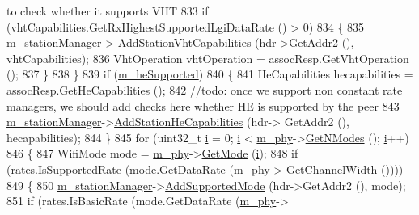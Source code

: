 \begin{DoxyCode}
{       to check whether it supports VHT}
833                   \textcolor{keywordflow}{if} (vhtCapabilities.GetRxHighestSupportedLgiDataRate () > 0)
834                     \{
835                       \hyperlink{classns3_1_1RegularWifiMac_a76d1a5e27b64bfe36f24a55d1eea2775}{m\_stationManager}->
      \hyperlink{classns3_1_1WifiRemoteStationManager_a52b9e283f99e113cba95afbc2acea72b}{AddStationVhtCapabilities} (hdr->GetAddr2 (), vhtCapabilities);
836                       VhtOperation vhtOperation = assocResp.GetVhtOperation ();
837                     \}
838                 \}
839               \textcolor{keywordflow}{if} (\hyperlink{classns3_1_1RegularWifiMac_a9458143c722fa0b6e5d223d41585842a}{m\_heSupported})
840                 \{
841                   HeCapabilities hecapabilities = assocResp.GetHeCapabilities ();
842                   \textcolor{comment}{//todo: once we support non constant rate managers, we should add checks here whether HE
       is supported by the peer}
843                   \hyperlink{classns3_1_1RegularWifiMac_a76d1a5e27b64bfe36f24a55d1eea2775}{m\_stationManager}->\hyperlink{classns3_1_1WifiRemoteStationManager_a948fccf8ed2cb0dcfaa73784ec35db8e}{AddStationHeCapabilities} (hdr->
      GetAddr2 (), hecapabilities);
844                 \}
845               \textcolor{keywordflow}{for} (uint32\_t \hyperlink{bernuolliDistribution_8m_a6f6ccfcf58b31cb6412107d9d5281426}{i} = 0; \hyperlink{bernuolliDistribution_8m_a6f6ccfcf58b31cb6412107d9d5281426}{i} < \hyperlink{classns3_1_1RegularWifiMac_a1a6dad8eb0a057a4e1b459f518457a4c}{m\_phy}->\hyperlink{classns3_1_1WifiPhy_a2467e56b69d64bb2d648302f39397317}{GetNModes} (); \hyperlink{bernuolliDistribution_8m_a6f6ccfcf58b31cb6412107d9d5281426}{i}++)
846                 \{
847                   WifiMode mode = \hyperlink{classns3_1_1RegularWifiMac_a1a6dad8eb0a057a4e1b459f518457a4c}{m\_phy}->\hyperlink{classns3_1_1WifiPhy_ac35983a13a769a7fbaac43340b8cdaf2}{GetMode} (\hyperlink{bernuolliDistribution_8m_a6f6ccfcf58b31cb6412107d9d5281426}{i});
848                   \textcolor{keywordflow}{if} (rates.IsSupportedRate (mode.GetDataRate (\hyperlink{classns3_1_1RegularWifiMac_a1a6dad8eb0a057a4e1b459f518457a4c}{m\_phy}->
      \hyperlink{classns3_1_1WifiPhy_a4a5d5009b3b3308f2baeed42a2007189}{GetChannelWidth} ())))
849                     \{
850                       \hyperlink{classns3_1_1RegularWifiMac_a76d1a5e27b64bfe36f24a55d1eea2775}{m\_stationManager}->\hyperlink{classns3_1_1WifiRemoteStationManager_a90f4d6b042c2692493446d36a3de799f}{AddSupportedMode} (hdr->GetAddr2 (),
       mode);
851                       \textcolor{keywordflow}{if} (rates.IsBasicRate (mode.GetDataRate (\hyperlink{classns3_1_1RegularWifiMac_a1a6dad8eb0a057a4e1b459f518457a4c}{m\_phy}->

\end{DoxyCode}
